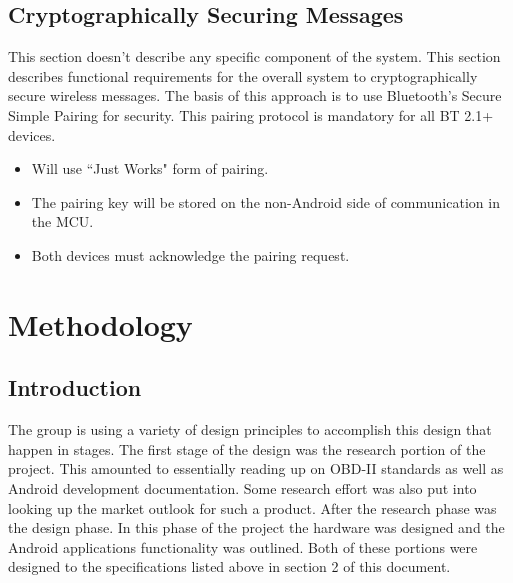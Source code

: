 \documentclass[12pt,letterpaper]{article}
\begin{document}
\subsection{Cryptographically Securing Messages}
This section doesn't describe any specific component of the system. This section describes functional requirements for the overall system to cryptographically secure wireless messages. The basis of this approach is to use Bluetooth's Secure Simple Pairing for security. This pairing protocol is mandatory for all BT 2.1+ devices.

\begin{itemize}
	\item Will use ``Just Works" form of pairing.
	\item The pairing key will be stored on the non-Android side of communication in the MCU.
	\item Both devices must acknowledge the pairing request.
\end{itemize} 

\newpage

\section{Methodology}
\subsection{Introduction}
The group is using a variety of design principles to accomplish this design that happen in stages. The first stage of the design was the research portion of the project. This amounted to essentially reading up on OBD-II standards as well as Android development documentation. Some research effort was also put into looking up the market outlook for such a product. After the research phase was the design phase. In this phase of the project the hardware was designed and the Android applications functionality was outlined. Both of these portions were designed to the specifications listed above in section 2 of this document. \\
\end{document}
